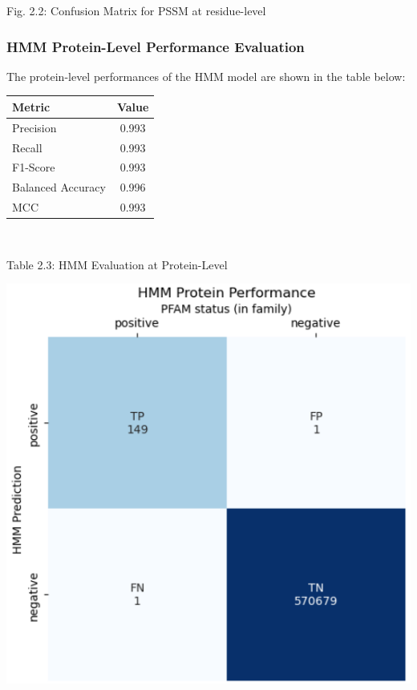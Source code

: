 \documentclass[10pt,twocolumn,letterpaper]{article}
\begin{document}
\begin{center}
    \small{Fig. 2.2: Confusion Matrix for PSSM at residue-level}
\end{center}

\subsubsection{HMM Protein-Level Performance Evaluation}


The protein-level performances of the HMM model are shown in the table below:

\begin{center}
    \begin{tabular}{lc}
        \toprule
        Metric & Value \\
        \midrule
        Precision & 0.993 \\
        Recall & 0.993 \\
        F1-Score & 0.993 \\
        Balanced Accuracy & 0.996 \\
        MCC & 0.993 \\
        \bottomrule
    \end{tabular}
\end{center} \\

\begin{center}
    \small{Table 2.3: HMM Evaluation at Protein-Level}
\end{center}

\begin{center}
    \includegraphics[scale=0.45]{report/img/hmm_prot_performance.png}
\end{center}
\end{document}
